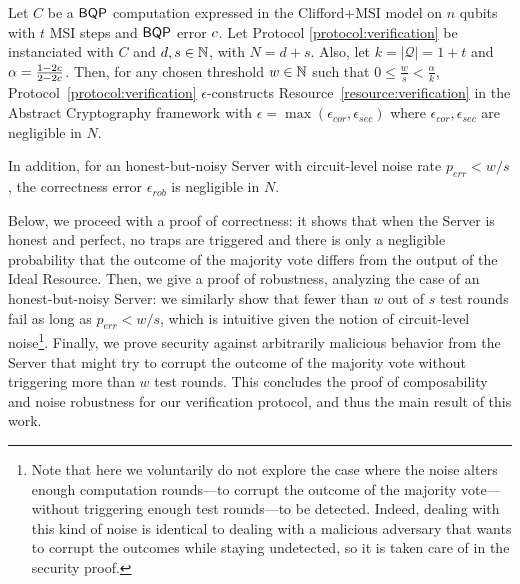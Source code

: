 \begin{theorem}
    \label{theorem:verification security}
    Let $C$ be a $\textsf{BQP}$ computation expressed in the Clifford+MSI model on $n$ qubits with $t$ MSI steps and $\textsf{BQP}$ error $c$.
    Let Protocol \ref{protocol:verification} be instanciated with $C$ and $d, s\in \mathbb N$, with $N=d+s$. Also, let  $k=|\mathcal Q|=1+t$ and $\alpha=\tfrac{1-2c}{2-2c}$.
    Then, for any chosen threshold $w\in\mathbb N$ such that $0\leq \tfrac{w}{s} < \tfrac{\alpha}{k}$,
    Protocol~\ref{protocol:verification} $\epsilon$-constructs Resource~\ref{resource:verification} in the Abstract Cryptography framework with $\epsilon = \max(\epsilon_{cor}, \epsilon_{sec})$ where $\epsilon_{cor}, \epsilon_{sec}$ are negligible in $N$.

In addition, for an honest-but-noisy Server with circuit-level noise rate $p_{err}<w/s$, the correctness error $\epsilon_{rob}$ is negligible in $N$.
\end{theorem}

Below, we proceed with a proof of correctness: it shows that when the Server is honest and perfect, no traps are triggered and there is only a negligible probability that the outcome of the majority vote differs from the output of the Ideal Resource. Then, we give a proof of robustness, analyzing the case of an honest-but-noisy Server: we similarly show that fewer than $w$ out of $s$ test rounds fail as long as $p_{err}< w/s$, which is intuitive given the notion of circuit-level noise\footnote{Note that here we voluntarily do not explore the case where the noise alters enough computation rounds---to corrupt the outcome of the majority vote---without triggering enough test rounds---to be detected. Indeed, dealing with this kind of noise is identical to dealing with a malicious adversary that wants to corrupt the outcomes while staying undetected, so it is taken care of in the security proof.}.
Finally, we prove security against arbitrarily malicious behavior from the Server that might try to corrupt the outcome of the majority vote without triggering more than $w$ test rounds.
This concludes the proof of composability and noise robustness for our verification protocol, and thus the main result of this work.

